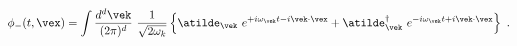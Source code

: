 \begin{equation}
 \phi_- (t,\vex ) = \int \frac{d^d\vek}{(2\pi )^d}~\frac{1}{\sqrt{2\omega_k}}
  \left\{ \atilde_{\vek}~e^{+i\omega_{\vek} t - i\vek \cdot \vex }
  +  \atilde^{\dagger}_{\vek}~e^{-i\omega_{\vek} t + i\vek \cdot \vex }
  \right\} \ .
\end{equation}

